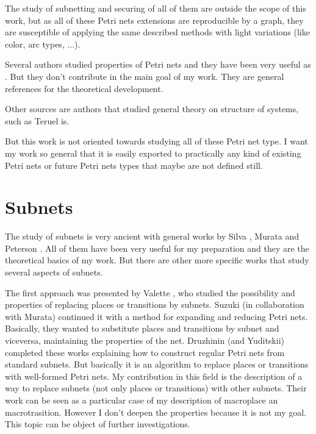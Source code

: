 The study of
subnetting and securing of all of them are outside the scope of this work,
but as all of these Petri nets extensions are reproducible by a graph, they are
susceptible of applying the same described methods with light variations
(like color, arc types, ...). 

 
Several authors studied properties of Petri nets and they have been very
useful as \cite{PROP-Murata1977412,PROP-Engelfriet1991575,PROP-Silva1992447,PROP-Recalde1998223,PROP-Zeng20021308}.
But they don't contribute in the main goal of my work. They are general references
for the theoretical development. 
 
Other sources are authors that studied general theory on structure of systems, such as Teruel \cite{G-Teruel1996271} is. 

But this work is not oriented towards studying all of these Petri net type.
I want my work so general that it is easily exported to practically any kind
of existing Petri nets or future Petri nets types that maybe are not defined still.

\section{Subnets}

The study of subnets is very ancient with general works by Silva \cite{G-Silva1985,G-Silva201213},
Murata \cite{G-Murata1977412,G-Murata1989541} and Peterson \cite{G-EPN-Peterson1981}. All of them have been very useful for my preparation and they are the theoretical basics of my work. But there are other more specific works that study several aspects of subnets.

The first approach was presented by Valette \cite{SN-Valette197935}, who
studied the possibility and properties of replacing places or transitions by subnets.
Suzuki (in collaboration with Murata) \cite{SN-Suzuki198351} continued it
with a method
for expanding and reducing Petri nets. Basically, they wanted to substitute
places and transitions by subnet and viceversa, maintaining the properties
of the net. Druzhinin (and Yuditskii) \cite{SN-DRUZHININVA19921922} completed
these works explaining how to construct regular Petri nets from standard subnets.
But basically it is an algorithm to replace places or transitions with well-formed
Petri nets. My contribution in this field is the description of a way to replace subnets (not only places or transitions) with other subnets. Their work can be seen as a particular
case of my description of macroplace an macrotrasition. However I don't deepen the properties because it is not my goal. This topic can be object of further investigations.

